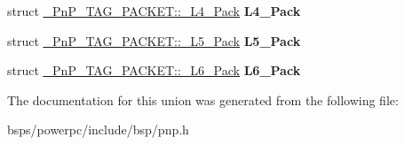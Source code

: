 \begin{DoxyCompactItemize}
\item 
\mbox{\label{union__PnP__TAG__PACKET_a28ce138de122e7173b523d77ea7a9980}} 
struct \mbox{\hyperlink{struct__PnP__TAG__PACKET_1_1__L4__Pack}{\+\_\+\+Pn\+P\+\_\+\+T\+A\+G\+\_\+\+P\+A\+C\+K\+E\+T\+::\+\_\+\+L4\+\_\+\+Pack}} {\bfseries L4\+\_\+\+Pack}
\item 
\mbox{\label{union__PnP__TAG__PACKET_abf3746b951cf5e33ee913e972b863d9f}} 
struct \mbox{\hyperlink{struct__PnP__TAG__PACKET_1_1__L5__Pack}{\+\_\+\+Pn\+P\+\_\+\+T\+A\+G\+\_\+\+P\+A\+C\+K\+E\+T\+::\+\_\+\+L5\+\_\+\+Pack}} {\bfseries L5\+\_\+\+Pack}
\item 
\mbox{\label{union__PnP__TAG__PACKET_a641dba01f167305abdeb3dd3d71933cb}} 
struct \mbox{\hyperlink{struct__PnP__TAG__PACKET_1_1__L6__Pack}{\+\_\+\+Pn\+P\+\_\+\+T\+A\+G\+\_\+\+P\+A\+C\+K\+E\+T\+::\+\_\+\+L6\+\_\+\+Pack}} {\bfseries L6\+\_\+\+Pack}
\end{DoxyCompactItemize}


The documentation for this union was generated from the following file\+:\begin{DoxyCompactItemize}
\item 
bsps/powerpc/include/bsp/pnp.\+h\end{DoxyCompactItemize}
